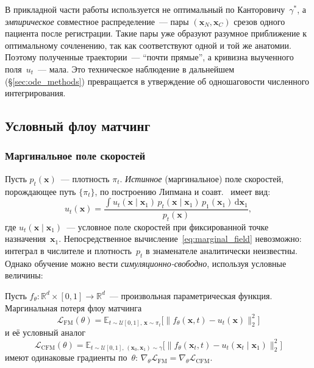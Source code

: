 В прикладной части работы используется не оптимальный по Канторовичу~$\gamma^*$, а \emph{эмпирическое} совместное распределение~--- пары $(\mathbf{x}_N,\mathbf{x}_C)$ срезов одного пациента после регистрации. Такие пары уже образуют разумное приближение к оптимальному сочленению, так как соответствуют одной и той же анатомии. Поэтому полученные траектории~--- ``почти прямые'', а кривизна выученного поля~$u_t$~--- мала. Это техническое наблюдение в дальнейшем (\S\ref{sec:ode_methods}) превращается в утверждение об одношаговости численного интегрирования.

\subsection{Условный флоу матчинг}
\label{sec:cfm_theory}

\subsubsection{Маргинальное поле скоростей}

Пусть $p_t(\mathbf{x})$~--- плотность $\pi_t$. \emph{Истинное} (маргинальное) поле скоростей, порождающее путь $\{\pi_t\}$, по построению Липмана и соавт.~\cite{lipman2022flow} имеет вид:
\begin{equation}
    u_t(\mathbf{x}) = \frac{\int u_t(\mathbf{x}\mid\mathbf{x}_1)\, p_t(\mathbf{x}\mid\mathbf{x}_1)\, p_1(\mathbf{x}_1)\,\mathrm{d}\mathbf{x}_1}{p_t(\mathbf{x})},
    \label{eq:marginal_field}
\end{equation}
где $u_t(\mathbf{x}\mid\mathbf{x}_1)$~--- условное поле скоростей при фиксированной точке назначения~$\mathbf{x}_1$. Непосредственное вычисление~\eqref{eq:marginal_field} невозможно: интеграл в числителе и плотность~$p_t$ в знаменателе аналитически неизвестны. Однако обучение можно вести \emph{симуляционно-свободно}, используя условные величины:

\begin{theorem}
\label{thm:sim_free}
Пусть $f_\theta:\mathbb{R}^d\times[0,1]\to\mathbb{R}^d$~--- произвольная параметрическая функция. Маргинальная потеря флоу матчинга
\begin{equation}
    \mathcal{L}_{\mathrm{FM}}(\theta) = \mathbb{E}_{t\sim\mathcal{U}[0,1],\,\mathbf{x}\sim\pi_t}\bigl[\lVert f_\theta(\mathbf{x},t)-u_t(\mathbf{x})\rVert_2^2\bigr]
    \label{eq:fm_loss_marginal}
\end{equation}
и её условный аналог
\begin{equation}
    \mathcal{L}_{\mathrm{CFM}}(\theta) = \mathbb{E}_{t\sim\mathcal{U}[0,1],\,(\mathbf{x}_0,\mathbf{x}_1)\sim\gamma}\bigl[\lVert f_\theta(\mathbf{x}_t,t)-u_t(\mathbf{x}_t\mid\mathbf{x}_1)\rVert_2^2\bigr]
    \label{eq:cfm_loss}
\end{equation}
имеют одинаковые градиенты по~$\theta$: $\nabla_\theta\mathcal{L}_{\mathrm{FM}}=\nabla_\theta\mathcal{L}_{\mathrm{CFM}}$.
\end{theorem}

